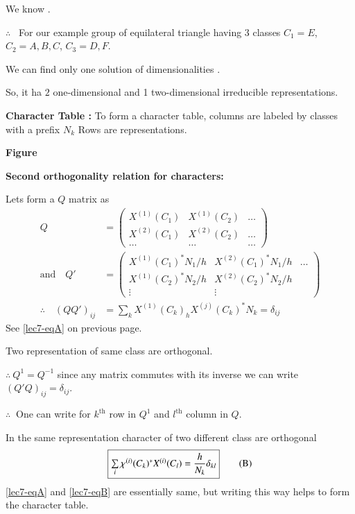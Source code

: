 We know .

$\therefore$ \ For our example group of equilateral triangle having 3 classes $C_{1}=E$, $C_{2}=A,B,C$, $C_{3}=D,F$.

We can find only one solution of dimensionalities .

So, it ha $2$ one-dimensional and 1 two-dimensional irreducible representations.

\noindent
{\bf Character Table :} To form a character table, columns are labeled by classes with a prefix $N_{k}$ Rows are representations.
\begin{center}
{\bf Figure}
\end{center}

\noindent
{\bf Second orthogonality relation for characters:}

Lets form a $Q$ matrix as
\begin{align*}
Q &= \left(
\begin{matrix}
X^{(1)}(C_{1}) & X^{(1)}(C_{2}) & \ldots\\
X^{(2)}(C_{1}) & X^{(2)}(C_{2}) & \ldots\\
\ldots & \ldots & \ldots
\end{matrix}
\right)\\
\text{and}\quad Q' &= \left(
\begin{matrix}
X^{(1)}(C_{1})^{*}N_{1}/h & X^{(2)}(C_{1})^{*}N_{1}/h & \ldots\\
X^{(1)}(C_{2})^{*}N_{2}/h & X^{(2)}(C_{2})^{*}N_{2}/h & \\
\vdots & \vdots & 
\end{matrix}
\right)\\
\therefore\quad (QQ')_{ij} &= \sum\limits_{k}X^{(1)}(C_{k})_{h}X^{(j)}(C_{k})^{*}N_{k}=\delta_{ij}
\end{align*}
See \eqref{lec7-eqA} on previous page.

Two representation of same class are orthogonal.

$\therefore \ Q^{1}=Q^{-1}$ since any matrix commutes with its inverse we can write $(Q'Q)_{ij}=\delta_{ij}$.

$\therefore \ $ One can write for $k^{\text{th}}$ row in $Q^{1}$ and $l^{\text{th}}$ column in $Q$.

In the same representation character of two different class are orthogonal
\begin{equation*}
\fbox{$\sum\limits_{i}\chi^{(i)}(C_{k})^{*}X^{(i)}(C_{l})=\dfrac{h}{N_{k}}\delta_{kl}$}\tag{B}\label{lec7-eqB}
\end{equation*}
\eqref{lec7-eqA} and \eqref{lec7-eqB} are essentially same, but writing this way helps to form the character table.

